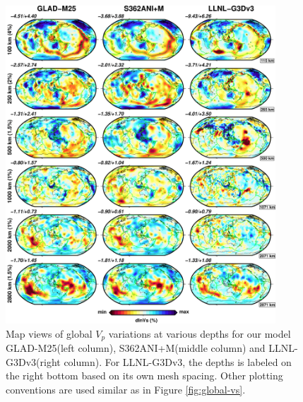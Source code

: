 \documentclass[extra,mreferee]{gji}
\begin{document}
\begin{figure}
\includegraphics[width=0.9\textwidth]{figures/depth_slice/globe_vp_S362ANI-LLNL.pdf}
  \caption{Map views of global $V_p$ variations at various depths for our model GLAD-M25(left column), S362ANI+M(middle column) and LLNL-G3Dv3(right column)\citep{simmons2012llnl}. For LLNL-G3Dv3, the depths is labeled on the right bottom based on its own mesh spacing. Other plotting conventions are used similar as in Figure \ref{fig:global-vs}.}
\label{fig:global-vp}
\centering
\end{figure}
\end{document}
